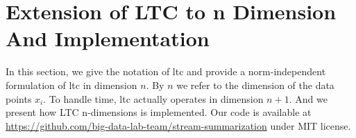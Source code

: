 \chapter{Extension of LTC to n Dimension And Implementation}
\label{chap:ltc-extension}

In this section, we give the notation of \acrshort{ltc} and provide a
norm-independent formulation of \acrshort{ltc} in dimension $n$. By $n$ we refer
to the dimension of the data points $x_i$. To handle time, \acrshort{ltc}
actually operates in dimension $n+1$. And we present how LTC n-dimensions is
implemented. Our code is available at
\url{https://github.com/big-data-lab-team/stream-summarization} under MIT
license.





